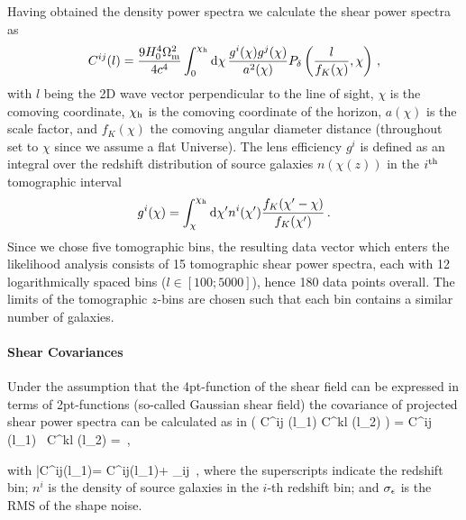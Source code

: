 Having obtained the density power spectra we calculate the shear power spectra as
\begin{equation}
\label{eq:pdeltatopkappa}
C ^{ij} (l) = \frac{9H_0^4 \om^2}{4c^4} \int_0^{\chi_\mr h}
\mr d \chi \, \frac{g^{i}(\chi) g^{j}(\chi)}{a^2(\chi)} \pd \left(\frac{l}{f_K(\chi)},\chi \right) \,,
\end{equation}
with $l$ being the 2D wave vector perpendicular to the line of sight, $\chi$ is the comoving coordinate, $\chi_\mathrm h$ is the comoving coordinate of the horizon, $a(\chi)$ is the scale factor, and $f_K(\chi)$ the comoving angular diameter distance (throughout set to $\chi$ since we assume a flat Universe). The lens efficiency $g^{i}$ is defined as an integral over the redshift distribution of source galaxies $n(\chi(z))$ in the $i^\mathrm{th}$ tomographic interval
\begin{equation}
\label{eq:redshift_distri}
g^{i}(\chi) = \int_\chi^{\chi_{\mr h}} \mr d \chi' n^{i} (\chi') \frac{f_K (\chi'-\chi)}{f_K (\chi')} \,.
\end{equation}
Since we chose five tomographic bins, the resulting data vector which enters the likelihood analysis consists of 15 tomographic shear power spectra, each with 12 logarithmically spaced bins ($l \in [100;5000]$), hence 180 data points overall. The limits of the tomographic $z$-bins are chosen such that each bin contains a similar number of galaxies.


\paragraph{Shear Covariances} Under the assumption that the 4pt-function of the shear field can be expressed in terms of 2pt-functions (so-called Gaussian shear field) the covariance of projected shear power spectra can be calculated as in \citep{huj04}
\be
\label{eq:covhujain}
 \left( C^{ij} (l_1) C^{kl} (l_2) \right) = \langle \Delta C^{ij} (l_1) \, \Delta C^{kl} (l_2) \rangle  =    \,,
\ee

with
\be
\label{details}
\bar C^{ij}(l_1)= C^{ij}(l_1)+ \delta_{ij}  \,,
\ee
where the superscripts indicate the redshift bin; $n^{i}$ is the density of source galaxies in the $i$-th redshift bin; and $\sigma_\epsilon$ is the RMS of the shape noise.

